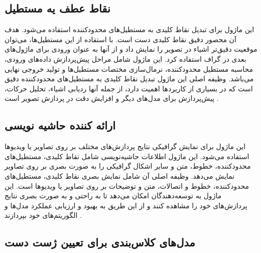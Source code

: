 \subsection{نقاط عطف یه مستطیل\protect{}}
این ماژول برای تبدیل نقاط کلیدی به مستطیل‌های محدودکننده استفاده می‌شود. هدف آن محصور دقیق نقاط کلیدی دست است. با استفاده از این مستطیل‌ها، می‌توان موقعیت دقیق‌تر اشیاء در 
تصویر را نمایش داد و از آنها به عنوان ورودی برای ماژول‌های بعدی در گراف استفاده کرد. این ماژول شامل مراحل پیش‌پردازش داده‌های ورودی، محاسبه مستطیل محدودکننده، نرمال‌سازی مختصات مستطیل‌ها و تولید خروجی نهایی 
 می‌باشد. وظیفه اصلی این ماژول تبدیل نقاط کلیدی به مستطیل‌های محدودکننده دقیق است که در بسیاری از کاربردها اهمیت دارد، از جمله آنها ردیابی اشیاء، تحلیل حرکات، پیش‌پردازش برای مدل‌های دیگر و افزایش دقت در پردازش تصویر است \cite{zhang2020mediapipe}.


\subsection{ارائه کننده حاشیه نویسی\protect{}}
این ماژول برای نمایش گرافیکی نتایج پردازش‌های مختلف بر روی تصاویر یا ویدیوها استفاده می‌شود. این ماژول اطلاعات حاشیه‌نویسی شامل نقاط کلیدی، مستطیل‌های محدودکننده، خطوط، متن و سایر اشکال گرافیکی را به صورت 
بصری بر روی تصاویر نمایش می‌دهد. وظیفه اصلی آن شامل نمایش بصری نقاط کلیدی، مستطیل‌های محدودکننده، خطوط و اتصالات، متن و توضیحات بر روی تصاویر یا ویدیوها است. این ماژول به توسعه‌دهندگان امکان 
می‌دهد تا به راحتی و به صورت بصری نتایج پردازش‌های خود را مشاهده کنند و از این طریق به بهبود و ارزیابی عملکرد مدل‌ها و الگوریتم‌های خود بپردازند \cite{zhang2020mediapipe}.



\subsection{مدل‌های کلاس‌بندی برای تعیین ژست دست}

